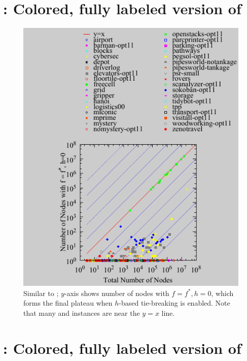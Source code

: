 \documentclass[10pt,letterpaper]{article}
\begin{document}
\section{: Colored, fully labeled version of }


\begin{figure}[htb]
 \includegraphics{tables/aaai16-frontier/aaai16prelim3/lmcut_frontier-front.pdf}
 \caption{
 Similar to ; $y$-axis shows
 number of nodes with $f=f^*, h=0$, which forms the final
  plateau when $h$-based tie-breaking is enabled.
  Note that many  and  instances are near the $y=x$ line.
 }
 \label{plateau-full}
\end{figure}

\newpage
\section{: Colored, fully labeled version of }
\end{document}
